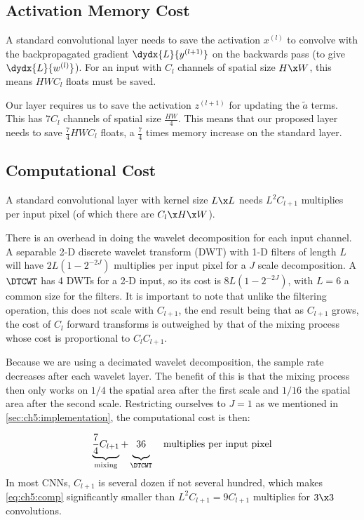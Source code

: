 \subsection{Activation Memory Cost}
A standard convolutional layer needs to save the activation $x^{(l)}$ to
convolve with the backpropagated gradient $\dydx{L}{y^{(l+1)}}$ on the backwards
pass (to give $\dydx{L}{w^{(l)}}$). For an input with $C_l$ channels of spatial size $H\x W$, this means
$HWC_l$ floats must be saved. 

Our layer requires us to save the activation
$z^{(l+1)}$ for updating the $\tilde{a}$ terms. This has $7C_l$ channels of
spatial size $\frac{HW}{4}$. This means that our proposed layer needs to save
$\frac{7}{4}HWC_l$ floats, a $\frac{7}{4}$ times memory increase on the standard
layer.


\subsection{Computational Cost}\label{sec:ch5:computation}
A standard convolutional layer with kernel size $L\x L$ needs $L^2C_{l+1}$
multiplies per input pixel (of which there are $C_{l}\x H\x W$).

There is an overhead in doing the wavelet decomposition for each input channel.
A separable 2-D discrete wavelet transform (DWT) with 1-D filters of length $L$
will have $2L\left(1-2^{-2J}\right)$ multiplies per input pixel for a $J$ scale
decomposition. A $\DTCWT$ has 4 DWTs for a 2-D input, so its cost is
$8L\left(1-2^{-2J}\right)$, with $L=6$ a common size for the filters. It is
important to note that unlike the filtering operation, this does not scale with
$C_{l+1}$, the end result being that as $C_{l+1}$ grows, the cost of $C_l$
forward transforms is outweighed by that of the mixing process whose cost is
proportional to $C_l C_{l+1}$.

Because we are using a decimated wavelet decomposition, the sample rate
decreases after each wavelet layer. The benefit of this is that the mixing
process then only works on $1/4$ the spatial area after the first scale
and $1/16$ the spatial area after the second scale. Restricting ourselves to
$J=1$ as we mentioned in \autoref{sec:ch5:implementation}, the computational cost is
then:

\begin{equation}
  \underbrace{ \frac{7}{4}C_{l+1} }_{\textrm{mixing}} +
  \underbrace{\vphantom{\frac{7}{4}} 36}_{\DTCWT} \quad
  \textrm{multiplies per input pixel}\label{eq:ch5:comp}
\end{equation}
In most CNNs, $C_{l+1}$ is several dozen if not several
hundred, which makes \eqref{eq:ch5:comp} significantly smaller than
$L^2C_{l+1}=9C_{l+1}$ multiplies for $3\x 3$ convolutions.

